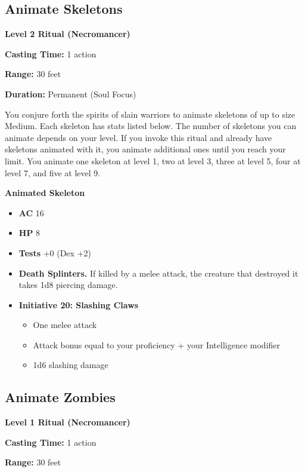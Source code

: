 \documentclass[12pt,letterpaper,twocolumn,openany,nodeprecatedcode,bg=none]{dndbook}
\providecommand{\tightlist}{%
  \setlength{\itemsep}{0pt}\setlength{\parskip}{0pt}}
\begin{document}
\subsection{Animate Skeletons}\label{animate-skeletons}

\textbf{Level 2 Ritual (Necromancer)}

\textbf{Casting Time:} 1 action

\textbf{Range:} 30 feet

\textbf{Duration:} Permanent (Soul Focus)

You conjure forth the spirits of slain warriors to animate skeletons of
up to size Medium. Each skeleton has stats listed below. The number of
skeletons you can animate depends on your level. If you invoke this
ritual and already have skeletons animated with it, you animate
additional ones until you reach your limit. You animate one skeleton at
level 1, two at level 3, three at level 5, four at level 7, and five at
level 9.

\textbf{Animated Skeleton}

\begin{itemize}
\tightlist
\item
  \textbf{AC} 16
\item
  \textbf{HP} 8
\item
  \textbf{Tests} +0 (Dex +2)
\item
  \textbf{Death Splinters.} If killed by a melee attack, the creature
  that destroyed it takes 1d8 piercing damage.
\item
  \textbf{Initiative 20: Slashing Claws}

  \begin{itemize}
  \tightlist
  \item
    One melee attack
  \item
    Attack bonus equal to your proficiency + your Intelligence modifier
  \item
    1d6 slashing damage
  \end{itemize}
\end{itemize}

\subsection{Animate Zombies}\label{animate-zombies}

\textbf{Level 1 Ritual (Necromancer)}

\textbf{Casting Time:} 1 action

\textbf{Range:} 30 feet
\end{document}
